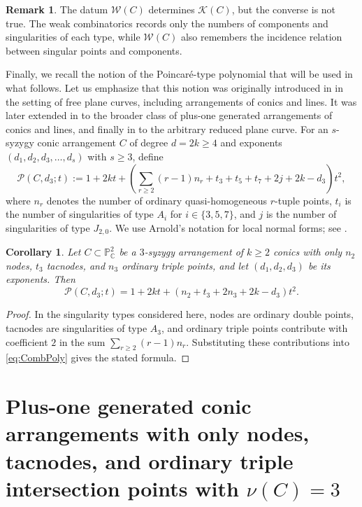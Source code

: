 \documentclass[11pt]{article}
\theoremstyle{plain}
\newtheorem{corollary}[thm]{Corollary}
\theoremstyle{definition}
\newtheorem{remark}[thm]{Remark}
\let\oldeqref\eqref
\renewcommand{\eqref}[1]{\begingroup\hypersetup{linkcolor=black}\oldeqref{#1}\endgroup}
\begin{document}
\begin{remark}
The datum $\mathcal W(C)$ determines $\mathcal K(C)$, but the converse is not true. The weak combinatorics records only the numbers of components and singularities of each type, while $\mathcal W(C)$ also remembers the incidence relation between singular points and components.
\end{remark}

Finally, we recall the notion of the Poincar\'e-type polynomial that will be used in what follows. Let us emphasize that this notion was originally introduced in \cite{PokoraPoly} in the setting of free plane curves, including arrangements of conics and lines. It was later extended in \cite{BJP} to the broader class of plus-one generated arrangements of conics and lines, and finally in \cite{BJ} to the arbitrary reduced plane curve. For an $s$-syzygy conic arrangement $C$ of degree $d=2k\geq4$ and exponents $(d_1,d_2,d_3,\ldots,d_s)$ with $s\geq3$, define
\begin{equation}
\mathcal{P}(C,d_3;t):=1+2kt+\left(\sum_{r\geq2}(r-1)n_r+t_3+t_5+t_7+2j+2k-d_3\right)t^2,
\label{eq:CombPoly}
\end{equation}
where $n_r$ denotes the number of ordinary quasi-homogeneous $r$-tuple points, $t_i$ is the number of singularities of type $A_i$ for $i\in\{3,5,7\}$, and $j$ is the number of singularities of type $J_{2,0}$. We use Arnold's notation for local normal forms; see \cite{Arnold}.

\begin{corollary} \label{prop:CombPoly}
Let $C\subset\mathbb P^2_{\mathbb C}$ be a $3$-syzygy arrangement of $k\geq2$ conics with only $n_2$ nodes, $t_3$ tacnodes, and $n_3$ ordinary triple points, and let $(d_1,d_2,d_3)$ be its exponents. Then
\[
\mathcal P(C,d_3;t)=1+2kt+(n_2+t_3+2n_3+2k-d_3)t^2.
\]
\end{corollary}

\begin{proof}
In the singularity types considered here, nodes are ordinary double points, tacnodes are singularities of type $A_3$, and ordinary triple points contribute with coefficient $2$ in the sum $\sum_{r\geq2}(r-1)n_r$. Substituting these contributions into \eqref{eq:CombPoly} gives the stated formula.
\end{proof}

\section{Plus-one generated conic arrangements with only nodes, tacnodes, and ordinary triple intersection points with \texorpdfstring{$\nu(C)=3$}{nu(C)=3}} \label{sec:POG3}
\end{document}
